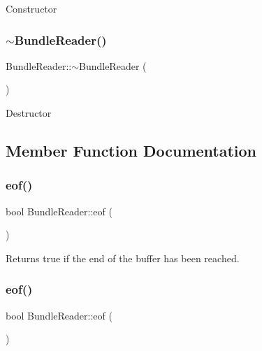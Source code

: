 Constructor \mbox{\label{classBundleReader_a74fc64e8701659f72821a8b91373500a}} 
\subsubsection{\texorpdfstring{$\sim$\+Bundle\+Reader()}{~BundleReader()}\hspace{0.1cm}{\footnotesize\ttfamily [2/2]}}
{\footnotesize\ttfamily Bundle\+Reader\+::$\sim$\+Bundle\+Reader (\begin{DoxyParamCaption}{ }\end{DoxyParamCaption})}

Destructor 

\subsection{Member Function Documentation}
\mbox{\label{classBundleReader_aa83930c070d01dd451c851310c25f85d}} 
\subsubsection{\texorpdfstring{eof()}{eof()}\hspace{0.1cm}{\footnotesize\ttfamily [1/2]}}
{\footnotesize\ttfamily bool Bundle\+Reader\+::eof (\begin{DoxyParamCaption}{ }\end{DoxyParamCaption})}

Returns true if the end of the buffer has been reached. \mbox{\label{classBundleReader_aa83930c070d01dd451c851310c25f85d}} 
\subsubsection{\texorpdfstring{eof()}{eof()}\hspace{0.1cm}{\footnotesize\ttfamily [2/2]}}
{\footnotesize\ttfamily bool Bundle\+Reader\+::eof (\begin{DoxyParamCaption}{ }\end{DoxyParamCaption})}

